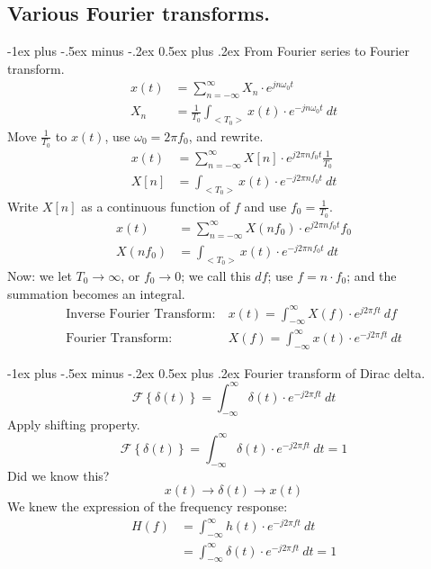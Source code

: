 \documentclass[10pt,landscape,a4paper]{article}
\makeatletter
\newcommand{\F}{\mathscr{F}}
\renewcommand{\section}{\@startsection{section}{1}{0mm}%
	{-1ex plus -.5ex minus -.2ex}%
	{0.5ex plus .2ex}%
	{\normalfont\large\bfseries}}
\makeatother
\begin{document}
\begin{multicols}{3}
		
		\newpage
		\part*{Various Fourier transforms.}
		
		\section{From Fourier series to Fourier transform.}
			\begin{align*}
				x(t)&=\sum_{n=-\infty}^{\infty}{X_n\cdot e^{jn\omega_0t}}\\
				X_n&=\frac{1}{T_0}\int_{<T_0>}{x(t)\cdot e^{-jn\omega_0t}~dt}
			\end{align*}
		Move $ \frac{1}{T_0} $ to $ x(t) $, use $ \omega_0=2\pi f_0 $, and rewrite.
			\begin{align*}
				x(t)&=\sum_{n=-\infty}^{\infty}{X[n]\cdot e^{j2\pi nf_0t}\frac{1}{T_0}}\\
				X[n]&=\int_{<T_0>}{x(t)\cdot e^{-j2\pi nf_0t}~dt}
			\end{align*}
		Write $ X[n] $ as a continuous function of $ f $ and use $ f_0=\frac{1}{T_0} $.
			\begin{align*}
				x(t)&=\sum_{n=-\infty}^{\infty}{X(nf_0)\cdot e^{j2\pi nf_0t}f_0}\\
				X(nf_0)&=\int_{<T_0>}{x(t)\cdot e^{-j2\pi nf_0t}~dt}
			\end{align*}
		Now: we let $ T_0 \rightarrow \infty $, or $ f_0 \rightarrow 0 $; we call this $ df $; use $ f=n\cdot f_0 $; and the summation becomes an integral.
			\begin{align*}
				\text{Inverse Fourier Transform:}~&x(t) = \int_{-\infty}^{\infty}{X(f)\cdot e^{j2\pi ft}~df}\\
				\text{Fourier Transform:}~&X(f) = \int_{-\infty}^{\infty}{x(t)\cdot e^{-j2\pi ft}~dt}
			\end{align*}
		
		\section{Fourier transform of Dirac delta.}
		\[
			\F\left\{\delta(t)\right\}=\int_{-\infty}^{\infty}{\delta(t)\cdot e^{-j2\pi ft}~dt}
		\]
		Apply shifting property.
		\[
			\F\left\{\delta(t)\right\}=\int_{-\infty}^{\infty}{\delta(t)\cdot e^{-j2\pi ft}~dt} = 1
		\]
		Did we know this?
		\[
			x(t)\rightarrow\boxed{\delta(t)}\rightarrow x(t)
		\]
		We knew the expression of the frequency response:
			\begin{align*}
				H(f)&=\int_{-\infty}^{\infty}{h(t)\cdot e^{-j2\pi ft}~dt}\\
				&=\int_{-\infty}^{\infty}{\delta(t)\cdot e^{-j2\pi ft}~dt}=1
			\end{align*}
		

\end{multicols}
\end{document}
